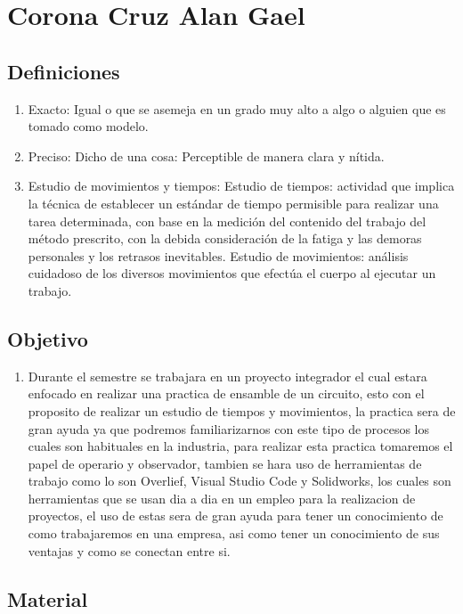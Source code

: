 \section{Corona Cruz Alan Gael}
\subsection{Definiciones}

\begin{enumerate}
    \item Exacto: Igual o que se asemeja en un grado muy alto a algo o alguien que es tomado como modelo. 
    \item Preciso: Dicho de una cosa: Perceptible de manera clara y nítida. 
    \item Estudio de movimientos y tiempos: Estudio de tiempos: actividad que implica la técnica de establecer un estándar de tiempo permisible para realizar una tarea determinada, con base en la medición del contenido del trabajo del método prescrito, con la debida consideración de la fatiga y las demoras personales y los retrasos inevitables.
Estudio de movimientos: análisis cuidadoso de los diversos movimientos que efectúa el cuerpo al ejecutar un trabajo. 
\end{enumerate}

\subsection{Objetivo}
\begin{enumerate}
    \item Durante el semestre se trabajara en un proyecto integrador el cual estara enfocado en realizar una practica de ensamble de un circuito, esto con el proposito de realizar un estudio de tiempos y movimientos, la practica sera de gran ayuda ya que podremos familiarizarnos con este tipo de procesos los cuales son habituales en la industria, para realizar esta practica tomaremos el papel de operario y observador, tambien se hara uso de herramientas de trabajo como lo son Overlief, Visual Studio Code y Solidworks, los cuales son herramientas que se usan dia a dia en un empleo para la realizacion de proyectos, el uso de estas sera de gran ayuda para tener un conocimiento de como trabajaremos en una empresa, asi como tener un conocimiento de sus ventajas y como se conectan entre si. 
 \end{enumerate}

\subsection{Material}

